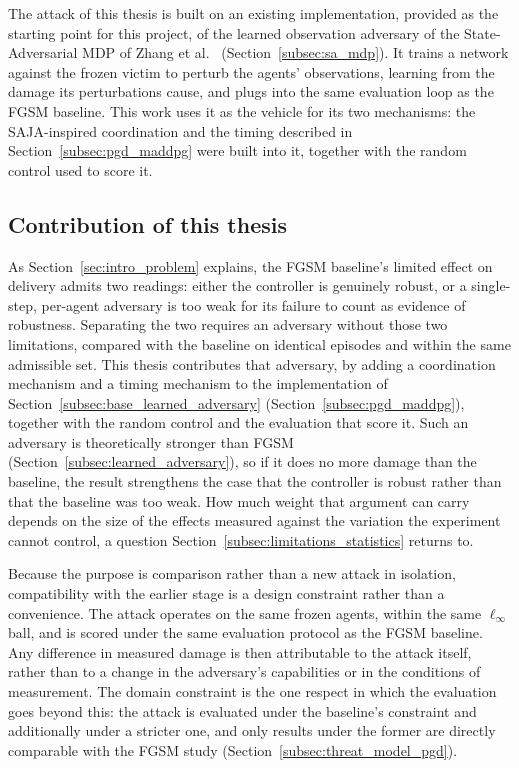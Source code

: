 The attack of this thesis is built on an existing implementation, provided as the
starting point for this project, of the learned observation adversary of the
State-Adversarial MDP of Zhang et al.~\cite{zhang2020robust}
(Section~\ref{subsec:sa_mdp}). It trains a network against the frozen victim to perturb
the agents' observations, learning from the damage its perturbations cause, and plugs
into the same evaluation loop as the FGSM baseline. This work uses it as the vehicle for
its two mechanisms: the SAJA-inspired coordination and the timing described
in Section~\ref{subsec:pgd_maddpg} were built into it, together with the random control
used to score it.

\subsection{Contribution of this thesis}
\label{subsec:contribution_scope}

As Section~\ref{sec:intro_problem} explains, the FGSM baseline's limited effect on
delivery admits two readings: either the controller is genuinely robust, or a
single-step, per-agent adversary is too weak for its failure to count as evidence of
robustness. Separating the two requires an adversary without those two limitations,
compared with the baseline on identical episodes and within the same admissible set.
This thesis contributes that adversary, by adding a coordination mechanism and a timing
mechanism to the implementation of Section~\ref{subsec:base_learned_adversary}
(Section~\ref{subsec:pgd_maddpg}), together with the random control and the evaluation
that score it. Such an adversary is theoretically stronger than FGSM
(Section~\ref{subsec:learned_adversary}), so if it does no more damage than the
baseline, the result strengthens the case that the controller is robust rather than
that the baseline was too weak. How much weight that argument can carry depends on the
size of the effects measured against the variation the experiment cannot control, a
question Section~\ref{subsec:limitations_statistics} returns to.

Because the purpose is comparison rather than a new attack in isolation,
compatibility with the earlier stage is a design constraint rather than a
convenience. The attack operates on the same frozen agents, within the same
$\ell_\infty$ ball, and is scored under the same evaluation protocol as the FGSM
baseline. Any difference in measured damage is then attributable to the attack
itself, rather than to a change in the adversary's capabilities or in the conditions
of measurement. The domain constraint is the one respect in which the evaluation goes
beyond this: the attack is evaluated under the baseline's constraint and additionally
under a stricter one, and only results under the former are directly comparable with
the FGSM study (Section~\ref{subsec:threat_model_pgd}).

